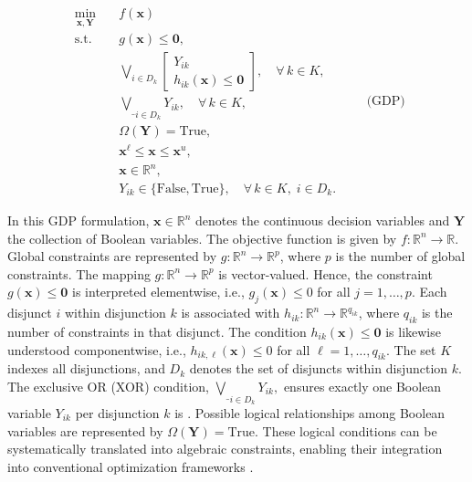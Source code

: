 \documentclass[11pt]{article}
\begin{document}
\begingroup
\begin{equation}
\begin{aligned}
    \min_{\mathbf{x}, \mathbf{Y}} \quad 
    & f(\mathbf{x}) \\
    \text{s.t.} \quad 
    & g(\mathbf{x}) \leq \mathbf{0}, \\
    & \bigvee_{i \in D_k} 
        \begin{bmatrix} 
            Y_{ik} \\
            h_{ik}(\mathbf{x}) \leq \mathbf{0} 
        \end{bmatrix}, \quad \forall\, k \in K, \\
    & \underset{i \in D_k}{\underline{\bigvee}} Y_{ik}, \quad \forall\, k \in K, \\
    & \Omega(\mathbf{Y}) = \text{True}, \\
    & \mathbf x^{\ell} \leq \mathbf{x} \leq \mathbf{x}^u, \\
    & \mathbf{x} \in \mathbb{R}^n, \\
    & Y_{ik} \in \{\text{False}, \text{True}\}, \quad \forall\, k \in K,\; i \in D_k.
\end{aligned}
\qquad \text{(GDP)}
\label{eq:GDP}
\end{equation}
\endgroup




In this GDP formulation, $\mathbf{x} \in \mathbb{R}^n$ denotes the continuous decision variables and 
$\mathbf{Y}$ the collection of Boolean variables. 
The objective function is given by $f: \mathbb{R}^n \to \mathbb{R}$. 
Global constraints are represented by $g: \mathbb{R}^n \to \mathbb{R}^p$, 
where $p$ is the number of global constraints. 
The mapping $g:\mathbb{R}^n \to \mathbb{R}^p$ is vector-valued. Hence, the constraint
$g(\mathbf{x}) \le \mathbf{0}$ is interpreted elementwise, i.e., $g_j(\mathbf{x}) \le 0$
for all $j=1,\dots,p$.
Each disjunct $i$ within disjunction $k$ is associated with 
$h_{ik} : \mathbb{R}^n \to \mathbb{R}^{q_{ik}}$, 
where $q_{ik}$ is the number of constraints in that disjunct. 
The condition $h_{ik}(\mathbf{x}) \leq \mathbf{0}$ is likewise understood 
componentwise, i.e., $h_{ik,\ell}(\mathbf{x}) \leq 0$ for all $\ell = 1,\dots,q_{ik}$. 
The set $K$ indexes all disjunctions, and $D_k$ denotes the set of disjuncts within disjunction $k$. 
The exclusive OR (XOR) condition,
\(
\underset{i \in D_k}{\underline{\bigvee}} Y_{ik},
\)
ensures exactly one Boolean variable $Y_{ik}$ per disjunction $k$ is . 
Possible logical relationships among Boolean variables are represented by $\Omega(\mathbf{Y}) = \text{True}$. 
These logical conditions can be systematically translated into algebraic constraints, enabling their integration 
into conventional optimization frameworks \cite{grossmannSystematicModelingDiscretecontinuous2013}.
\end{document}
